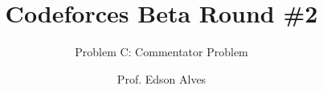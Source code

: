 \title{Codeforces Beta Round \#2}
\subtitle{Problem C: Commentator Problem}
\date{}
\author{Prof. Edson Alves}
